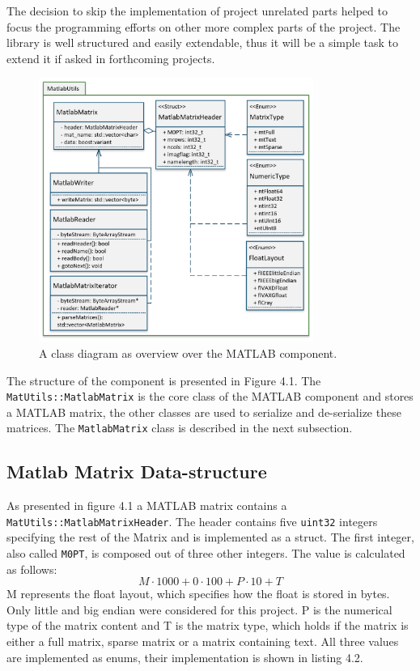 The decision to skip the implementation of project unrelated parts helped to focus the programming efforts on other more complex parts of the project. The library is well structured and easily extendable, thus it will be a simple task to extend it if asked in forthcoming projects.
\begin{figure}[h]
\centering
      \includegraphics[width=0.8\textwidth]{mlab}
        \caption{A class diagram as overview over the MATLAB component.}
\end{figure}
The structure of the component is presented in Figure 4.1. The \texttt{MatUtils::MatlabMatrix} is the core class of the MATLAB component and stores a MATLAB matrix, the other classes are used to serialize and de-serialize these matrices. The \texttt{MatlabMatrix} class is described in the next subsection.
\subsection{Matlab Matrix Data-structure}
As presented in figure 4.1 a MATLAB matrix contains a \texttt{MatUtils::MatlabMatrixHeader}. The header contains five \texttt{uint32} integers specifying the rest of the Matrix and is implemented as a struct. The first integer, also called \texttt{M0PT}, is composed out of three other integers. The value is calculated as follows:
$$M\cdot1000 + 0 \cdot 100 + P\cdot 10 + T$$
M represents the float layout, which specifies how the float is stored in bytes. Only little and big endian were considered for this project. P is the numerical type of the matrix content and T is the matrix type, which holds if the matrix is either a full matrix, sparse matrix or a matrix containing text. All three values are implemented as enums, their implementation is shown in listing 4.2.

